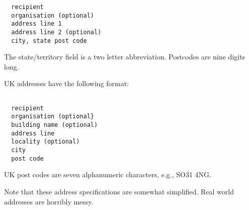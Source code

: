 \documentclass{article}
\begin{document}
\begin{verbatim}
  recipient
  organisation (optional)
  address line 1
  address line 2 (optional)
  city, state post code
  \end{verbatim}

The state/territory field is a two letter abbreviation.  Postcodes
are nine digits long.

UK addresses have the following format:

\begin{verbatim}

  recipient
  organisation (optional}
  building name (optional)
  address line 
  locality (optional)
  city
  post code
  \end{verbatim}

UK post codes are seven alphanumeric characters, e.g., SO31 4NG.

Note that these address specifications are somewhat simplified.  Real world
addresses are horribly messy.
\end{document}
